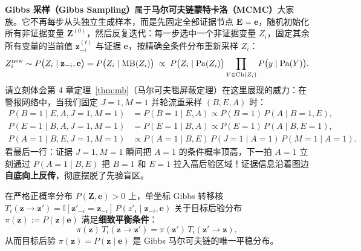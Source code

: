 \textbf{Gibbs 采样（Gibbs Sampling）}属于\textbf{马尔可夫链蒙特卡洛（MCMC）}大家族。它不再每步从头独立生成样本，而是先固定全部证据节点 $\mathbf{E} = \mathbf{e}$，随机初始化所有非证据变量 $\mathbf{Z}^{(0)}$，然后反复迭代：每一步选中一个非证据变量 $Z_i$，固定其余所有变量的当前值 $\mathbf{z}^{(t)}_{-i}$ 与证据 $\mathbf{e}$，按精确全条件分布重新采样 $Z_i$：
\begin{equation}\label{eq:gibbs-update}
  Z_i^{\text{new}} \sim P\big(Z_i \mid \mathbf{z}_{-i}, \mathbf{e}\big) = P\big(Z_i \mid \operatorname{MB}(Z_i)\big)
  \;\propto\; P\big(Z_i \mid \operatorname{Pa}(Z_i)\big) \prod_{Y \in \operatorname{Ch}(Z_i)} P\big(y \mid \operatorname{Pa}(Y)\big).
\end{equation}
请立刻体会第 4 章定理~\ref{thm:mb}（马尔可夫毯屏蔽定理）在这里展现的威力：在警报网络中，当我们固定 $J=1, M=1$ 并轮流重采样 $(B, E, A)$ 时：
\begin{align*}
  P(B=1 \mid E, A, J=1, M=1) &= P(B=1 \mid E, A) \propto P(B=1)\, P(A \mid B=1, E), \\
  P(E=1 \mid B, A, J=1, M=1) &= P(E=1 \mid B, A) \propto P(E=1)\, P(A \mid B, E=1), \\
  P(A=1 \mid B, E, J=1, M=1) &\propto P(A=1 \mid B, E)\, P(J=1 \mid A=1)\, P(M=1 \mid A=1).
\end{align*}
看最后一行：证据 $J=1, M=1$ 瞬间把 $A=1$ 的条件概率顶高，下一拍 $A=1$ 立刻通过 $P(A=1\mid B, E)$ 把 $B=1$ 和 $E=1$ 拉入高后验区域！证据信息沿着图边\textbf{自底向上反传}，彻底摆脱了先验盲区。

\begin{thmBox}
\begin{theorem}\label{thm:gibbs-stationarity}
在严格正概率分布 $P(\mathbf{Z}, \mathbf{e}) > 0$ 上，单坐标 Gibbs 转移核 $T_i(\mathbf{z} \to \mathbf{z}') = \mathbb{I}[\mathbf{z}'_{-i} = \mathbf{z}_{-i}]\, P(z'_i \mid \mathbf{z}_{-i}, \mathbf{e})$ 关于目标后验分布 $\pi(\mathbf{z}) := P(\mathbf{z} \mid \mathbf{e})$ 满足\textbf{细致平衡条件}：
\[
  \pi(\mathbf{z})\, T_i(\mathbf{z} \to \mathbf{z}') = \pi(\mathbf{z}')\, T_i(\mathbf{z}' \to \mathbf{z}),
\]
从而目标后验 $\pi(\mathbf{z}) = P(\mathbf{z} \mid \mathbf{e})$ 是 Gibbs 马尔可夫链的唯一平稳分布。
\end{theorem}
\end{thmBox}

